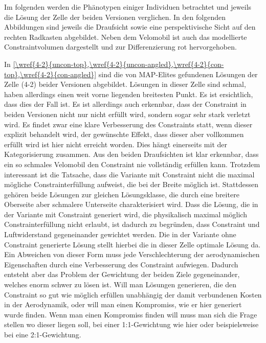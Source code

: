 \newcommand{\allrefWheelcase}[1]{
	\cref{\wref{#1}{uncon-top},\wref{#1}{uncon-angled},\wref{#1}{con-top},\wref{#1}{con-angled}}
}

Im folgenden werden die Phänotypen einiger Individuen betrachtet und jeweils die Lösung der Zelle der beiden Versionen verglichen.
In den folgenden Abbildungen sind jeweils die Draufsicht sowie eine perspektivische Sicht auf den rechten Radkasten abgebildet.
Neben dem Velomobil ist auch das modellierte Constraintvolumen dargestellt und zur Differenzierung rot hervorgehoben.


In \allrefWheelcase{4-2} sind die von MAP-Elites gefundenen Lösungen der Zelle (4-2) beider Versionen abgebildet.
Lösungen in dieser Zelle sind schmal, haben allerdings einen weit vorne liegenden breitesten Punkt.
Es ist ersichtlich, dass dies der Fall ist.
Es ist allerdings auch erkennbar, dass der Constraint in beiden Versionen nicht nur nicht erfüllt wird, sondern sogar sehr stark verletzt wird.
Es findet zwar eine klare Verbesserung des Constraints statt, wenn dieser explizit behandelt wird, der gewünschte Effekt, dass dieser aber vollkommen erfüllt wird ist hier nicht erreicht worden.
Dies hängt einerseits mit der Kategorisierung zusammen. Aus den beiden Draufsichten ist klar erkennbar, dass ein so schmales Velomobil den Constraint nie vollständig erfüllen kann.
Trotzdem interessant ist die Tatsache, dass die Variante mit Constraint nicht die maximal mögliche Constrainterfüllung aufweist, die bei der Breite möglich ist.
Stattdessen gehören beide Lösungen zur gleichen Lösungsklasse, die durch eine breitere Oberseite aber schmalere Unterseite charakterisiert wird.
Dass die Lösung, die in der Variante mit Constraint generiert wird, die physikalisch maximal möglich Constrainterfüllung nicht erlaubt, ist dadurch zu begründen, dass Constraint und Luftwiderstand gegeneinander gewichtet werden.
Die in der Variante ohne Constraint generierte Lösung stellt hierbei die in dieser Zelle optimale Lösung da.
Ein Abweichen von dieser Form muss jede Verschlechterung der aerodynamischen Eigenschaften durch eine Verbesserung des Constraint aufwiegen.
Dadurch entsteht aber das Problem der Gewichtung der beiden Ziele gegeneinander, welches enorm schwer zu lösen ist.
Will man Lösungen generieren, die den Constraint so gut wie möglich erfüllen unabhängig der damit verbundenen Kosten in der Aerodynamik, oder will man einen Kompromiss, wie er hier generiert wurde finden.
Wenn man einen Kompromiss finden will muss man sich die Frage stellen wo dieser liegen soll, bei einer 1:1-Gewichtung wie hier oder beispielsweise bei eine 2:1-Gewichtung.


